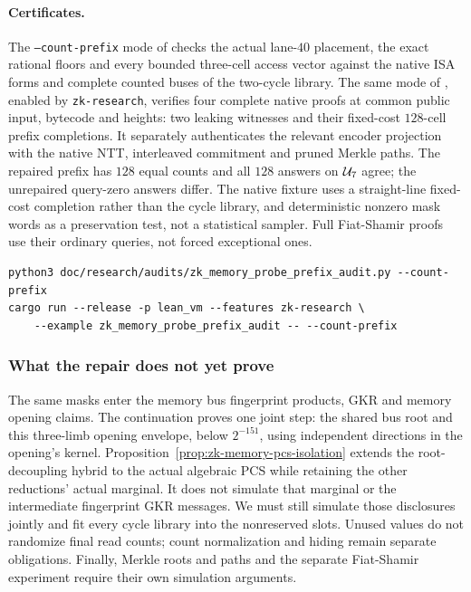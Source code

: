 \paragraph{Certificates.} The \texttt{--count-prefix} mode of  checks the actual lane-$40$ placement, the exact rational floors and every bounded three-cell access vector against the native ISA forms and complete counted buses of the two-cycle library. The same mode of , enabled by \texttt{zk-research}, verifies four complete native proofs at common public input, bytecode and heights: two leaking witnesses and their fixed-cost $128$-cell prefix completions. It separately authenticates the relevant encoder projection with the native NTT, interleaved commitment and pruned Merkle paths. The repaired prefix has $128$ equal counts and all $128$ answers on $\mathcal{U}_7$ agree; the unrepaired query-zero answers differ. The native fixture uses a straight-line fixed-cost completion rather than the cycle library, and deterministic nonzero mask words as a preservation test, not a statistical sampler. Full Fiat-Shamir proofs use their ordinary queries, not forced exceptional ones.
\begin{verbatim}
python3 doc/research/audits/zk_memory_probe_prefix_audit.py --count-prefix
cargo run --release -p lean_vm --features zk-research \
    --example zk_memory_probe_prefix_audit -- --count-prefix
\end{verbatim}

\subsubsection{What the repair does not yet prove}

The same masks enter the memory bus fingerprint products, GKR and memory opening claims. The continuation  proves one joint step: the shared bus root and this three-limb opening envelope, below $2^{-151}$, using independent directions in the opening's kernel. Proposition~\ref{prop:zk-memory-pcs-isolation} extends the root-decoupling hybrid to the actual algebraic PCS while retaining the other reductions' actual marginal. It does not simulate that marginal or the intermediate fingerprint GKR messages. We must still simulate those disclosures jointly and fit every cycle library into the nonreserved slots. Unused values do not randomize final read counts; count normalization and hiding remain separate obligations. Finally, Merkle roots and paths and the separate Fiat-Shamir experiment require their own simulation arguments.

